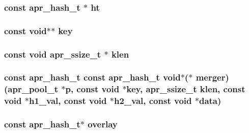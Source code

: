 \subsubsection[{\texorpdfstring{ht}{ht}}]{ const {\bf apr\+\_\+hash\+\_\+t} $\ast$ ht}\hypertarget{group__apr__hash_ga18cf3e4c61221aa79a41989befa7839f}{}\label{group__apr__hash_ga18cf3e4c61221aa79a41989befa7839f}
\subsubsection[{\texorpdfstring{key}{key}}]{\setlength{\rightskip}{0pt plus 5cm}const {\bf void}$\ast$$\ast$ key}\hypertarget{group__apr__hash_ga267123efa03ff8a912317c0ffc696ad3}{}\label{group__apr__hash_ga267123efa03ff8a912317c0ffc696ad3}
\subsubsection[{\texorpdfstring{klen}{klen}}]{\setlength{\rightskip}{0pt plus 5cm}const {\bf void} {\bf apr\+\_\+ssize\+\_\+t} $\ast$ klen}\hypertarget{group__apr__hash_ga339e1f6a04084df15b0761bf599c5ca7}{}\label{group__apr__hash_ga339e1f6a04084df15b0761bf599c5ca7}
\subsubsection[{\texorpdfstring{merger}{merger}}]{\setlength{\rightskip}{0pt plus 5cm}const {\bf apr\+\_\+hash\+\_\+t} const {\bf apr\+\_\+hash\+\_\+t} {\bf void}$\ast$($\ast$ merger) ({\bf apr\+\_\+pool\+\_\+t} $\ast${\bf p}, const {\bf void} $\ast${\bf key}, {\bf apr\+\_\+ssize\+\_\+t} {\bf klen}, const {\bf void} $\ast$h1\+\_\+val, const {\bf void} $\ast$h2\+\_\+val, const {\bf void} $\ast${\bf data})}\hypertarget{group__apr__hash_gad1c391a8c7b3ceed50df7f2c5445e2e3}{}\label{group__apr__hash_gad1c391a8c7b3ceed50df7f2c5445e2e3}
\subsubsection[{\texorpdfstring{overlay}{overlay}}]{\setlength{\rightskip}{0pt plus 5cm}const {\bf apr\+\_\+hash\+\_\+t}$\ast$ overlay}\hypertarget{group__apr__hash_gaa3a72034880df90e026ac7f9d71e3679}{}\label{group__apr__hash_gaa3a72034880df90e026ac7f9d71e3679}
